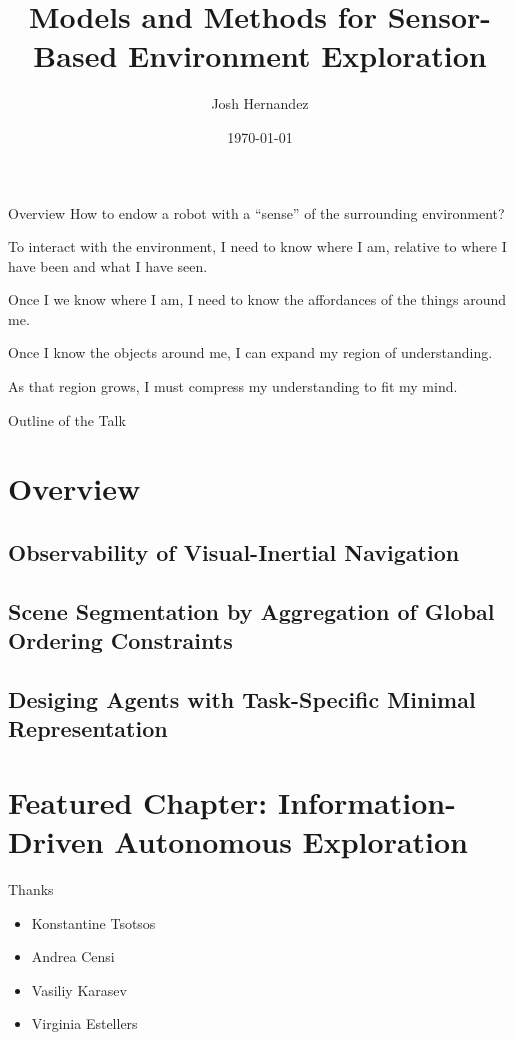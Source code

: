 \documentclass{beamer}
\author{Josh Hernandez}
\title{Models and Methods for Sensor-Based
Environment Exploration}
\date{\today}
\begin{document}
\titlepageframe

\begin{tframe}{Overview}
How to endow a robot with a ``sense'' of the surrounding environment?
\begin{description}
 \item<2->[Localization] To interact with the environment, I need to know where I am, relative to where I have been and what I have seen.
 \item<3->[Mapping] Once I we know where I am, I need to know the affordances of the things around me.
 \item<4->[Exploration] Once I know the objects around me, I can expand my region of understanding.
 \item<5->[Representation] As that region grows, I must compress my understanding to fit my mind.
\end{description}
\end{tframe}
\begin{tframe}{Outline of the Talk}
\tableofcontents
\end{tframe}
\section{Overview}
\subsection{Observability of Visual-Inertial Navigation}
%
\subsection{Scene Segmentation by Aggregation of Global Ordering Constraints}
%
\subsection{Desiging Agents with Task-Specific Minimal Representation}
%
\section{Featured Chapter: Information-Driven Autonomous Exploration}


\begin{tframe}{Thanks}
\begin{itemize}
\item Konstantine Tsotsos
\item Andrea Censi
\item Vasiliy Karasev
\item Virginia Estellers
\end{itemize}
\end{tframe}
\end{document}
